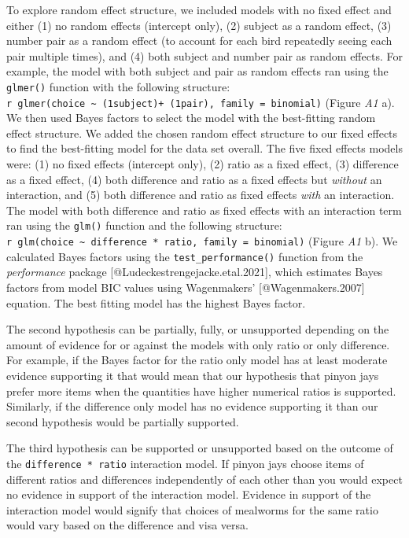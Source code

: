 \documentclass[
]{article}
\begin{document}
To explore random effect structure, we included models with no fixed
effect and either (1) no random effects (intercept only), (2) subject as
a random effect, (3) number pair as a random effect (to account for each
bird repeatedly seeing each pair multiple times), and (4) both subject
and number pair as random effects. For example, the model with both
subject and pair as random effects ran using the \texttt{glmer()}
function with the following structure:
\texttt{r\ glmer(choice\ \textasciitilde{}\ (1\textbar{}subject)+\ (1\textbar{}pair),\ family\ =\ binomial)}
(Figure \emph{A1} a). We then used Bayes factors to select the model
with the best-fitting random effect structure. We added the chosen
random effect structure to our fixed effects to find the best-fitting
model for the data set overall. The five fixed effects models were: (1)
no fixed effects (intercept only), (2) ratio as a fixed effect, (3)
difference as a fixed effect, (4) both difference and ratio as a fixed
effects but \emph{without} an interaction, and (5) both difference and
ratio as fixed effects \emph{with} an interaction. The model with both
difference and ratio as fixed effects with an interaction term ran using
the \texttt{glm()} function and the following structure:
\texttt{r\ glm(choice\ \textasciitilde{}\ difference\ *\ ratio,\ family\ =\ binomial)}
(Figure \emph{A1} b). We calculated Bayes factors using the
\texttt{test\_performance()} function from the \emph{performance}
package {[}@Ludeckestrengejacke.etal.2021{]}, which estimates Bayes
factors from model BIC values using Wagenmakers' {[}@Wagenmakers.2007{]}
equation. The best fitting model has the highest Bayes factor.

The second hypothesis can be partially, fully, or unsupported depending
on the amount of evidence for or against the models with only ratio or
only difference. For example, if the Bayes factor for the ratio only
model has at least moderate evidence supporting it that would mean that
our hypothesis that pinyon jays prefer more items when the quantities
have higher numerical ratios is supported. Similarly, if the difference
only model has no evidence supporting it than our second hypothesis
would be partially supported.

The third hypothesis can be supported or unsupported based on the
outcome of the \texttt{difference\ *\ ratio} interaction model. If
pinyon jays choose items of different ratios and differences
independently of each other than you would expect no evidence in support
of the interaction model. Evidence in support of the interaction model
would signify that choices of mealworms for the same ratio would vary
based on the difference and visa versa.
\end{document}
